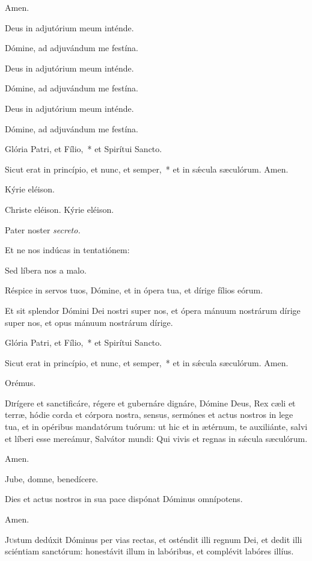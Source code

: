 \rr Amen.

\vv Deus in adjutórium meum inténde.

\rr Dómine, ad adjuvándum me festína.

\vv Deus in adjutórium meum inténde.

\rr Dómine, ad adjuvándum me festína.

\vv Deus in adjutórium meum inténde.

\rr Dómine, ad adjuvándum me festína.

\vv Glória Patri, et Fílio,~* et Spirítui Sancto.

\rr Sicut erat in princípio, et nunc, et semper,~* et in sǽcula sæculórum. Amen.

\vv Kýrie eléison.

\rr Christe eléison. Kýrie eléison.

\vv Pater noster \textit{secreto.}

\vv Et ne nos indúcas in tentatiónem:

\rr Sed líbera nos a malo.

\vv Réspice in servos tuos, Dómine, et in ópera tua, et dírige fílios eórum.

\rr Et sit splendor Dómini Dei nostri super nos, et ópera mánuum nostrárum
dírige super nos, et opus mánuum nostrárum dírige.

\vv Glória Patri, et Fílio,~* et Spirítui Sancto.

\rr Sicut erat in princípio, et nunc, et semper,~* et in sǽcula sæculórum. Amen.

Orémus.

\lettrine{D}{i}rígere et sanctificáre, régere et gubernáre dignáre, Dómine Deus, Rex
cæli et terræ, hódie corda et córpora nostra, sensus, sermónes et actus nostros in
lege tua, et in opéribus mandatórum tuórum: ut hic et in ætérnum, te auxiliánte,
salvi et líberi esse mereámur, Salvátor mundi: Qui vivis et regnas in sǽcula
sæculórum.

\rr Amen.

\vv Jube, domne, benedícere.


Dies et actus nostros in sua pace dispónat Dóminus omnípotens.

\rr Amen.

\lettrine{J}{u}stum dedúxit Dóminus per vias rectas, et osténdit illi regnum Dei, et dedit illi sciéntiam sanctórum: honestávit illum in labóribus, et complévit labóres illíus.

